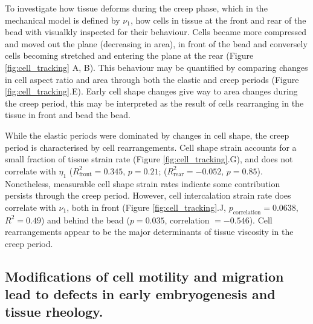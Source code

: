 To investigate how tissue deforms during the creep phase, which in the mechanical model is defined by $\nu_1$,
how cells in tissue  at the front and rear of the bead with visualkly inspected for their behaviour.
Cells became more compressed and moved out the plane (decreasing in area), in front of the bead and conversely cells becoming stretched and entering the plane at the rear (Figure \ref{fig:cell_tracking} A, B).
This behaviour may be quantified by comparing changes in cell aspect ratio and area through both the elastic and creep periods (Figure \ref{fig:cell_tracking}.E).
Early cell shape changes give way to area changes during the creep period, this may be interpreted as the result of cells rearranging in the tissue in front and bead the bead.

While the elastic periods were dominated by changes in cell shape, the creep period is characterised by cell rearrangements.
Cell shape strain accounts for a small fraction of tissue strain rate (Figure \ref{fig:cell_tracking}.G), and does not correlate with $\eta_1$ ($R_\text{front}^2 = 0.345$, $p = 0.21$; ($R_\text{rear}^2 = -0.052$, $p = 0.85$).
Nonetheless, measurable cell shape strain rates indicate some contribution persists through the creep period.
However, cell intercalation strain rate does correlate with $\nu_1$, both in front (Figure \ref{fig:cell_tracking}.J, $p_\text{correlation} = 0.0638$, $R^2 = 0.49$) and behind the bead ($p = 0.035$, correlation $= -0.546$).
Cell rearrangements appear to be the major determinants of tissue viscosity in the creep period.


\subsection{Modifications of cell motility and migration lead to defects in early embryogenesis and tissue rheology.}


